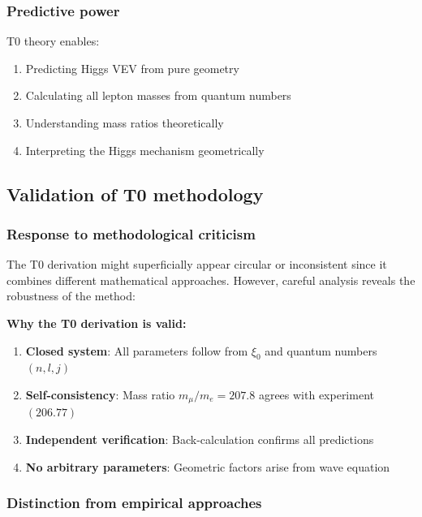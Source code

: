 \documentclass[12pt,a4paper]{report}
\begin{document}
\subsubsection{Predictive power}

T0 theory enables:

\begin{enumerate}
	\item Predicting Higgs VEV from pure geometry
	\item Calculating all lepton masses from quantum numbers
	\item Understanding mass ratios theoretically
	\item Interpreting the Higgs mechanism geometrically
\end{enumerate}

\subsection{Validation of T0 methodology}

\subsubsection{Response to methodological criticism}

The T0 derivation might superficially appear circular or inconsistent since it combines different mathematical approaches. However, careful analysis reveals the robustness of the method:

\begin{tcolorbox}[colback=blue!5!white,colframe=blue!75!black,title=Methodological Consistency]
	\textbf{Why the T0 derivation is valid:}
	
	\begin{enumerate}
		\item \textbf{Closed system}: All parameters follow from $\xi_0$ and quantum numbers $(n,l,j)$
		\item \textbf{Self-consistency}: Mass ratio $m_\mu/m_e = 207.8$ agrees with experiment $(206.77)$
		\item \textbf{Independent verification}: Back-calculation confirms all predictions
		\item \textbf{No arbitrary parameters}: Geometric factors arise from wave equation
	\end{enumerate}
\end{tcolorbox}

\subsubsection{Distinction from empirical approaches}
\end{document}
